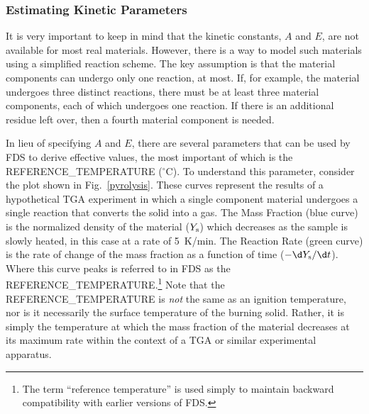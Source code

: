 \documentclass[11pt]{book}
\begin{document}
\subsubsection{Estimating Kinetic Parameters}

It is very important to keep in mind that the kinetic constants, $A$ and $E$, are not available for most real materials.  However, there is a way to model such materials using a simplified reaction scheme. The key assumption is that the material components can undergo only one reaction, at most. If, for example, the material undergoes three distinct reactions, there must be at least three material components, each of which undergoes one reaction. If there is an additional residue left over, then a fourth material component is needed.

In lieu of specifying $A$ and $E$, there are several parameters that can be used by FDS to derive effective values, the most important of which is the  {\ct REFERENCE\_TEMPERATURE} ($^\circ$C). To understand this parameter, consider the plot shown in Fig.~\ref{pyrolysis}. These curves represent the results of a hypothetical TGA experiment in which a single component material undergoes a single reaction that converts the solid into a gas. The Mass Fraction (blue curve) is the normalized density of the material ($Y_{\rm s}$) which decreases as the sample is slowly heated, in this case at a rate of 5~K/min. The Reaction Rate (green curve) is the rate of change of the mass fraction as a function of time ($-\d Y_{\rm s}/\d t$). Where this curve peaks is referred to in FDS as the {\ct REFERENCE\_TEMPERATURE}.\footnote{The term ``reference temperature'' is used simply to maintain backward compatibility with earlier versions of FDS.}  Note that the {\ct REFERENCE\_TEMPERATURE} is {\em not} the same as an ignition temperature, nor is it necessarily the surface temperature of the burning solid. Rather, it is simply the temperature at which the mass fraction of the material decreases at its maximum rate within the context of a TGA or similar experimental apparatus. 
\end{document}
